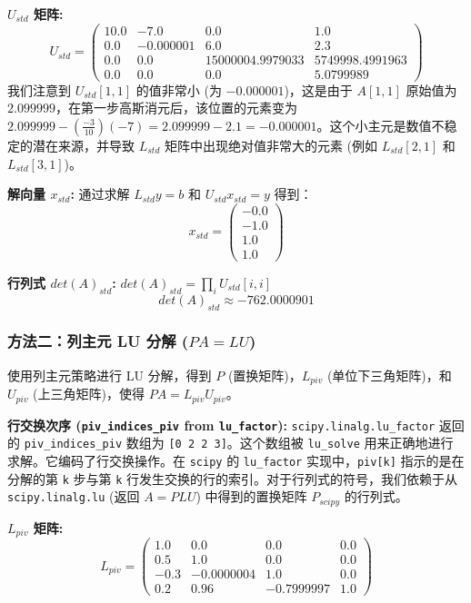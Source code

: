 \documentclass[11pt]{article}
\begin{document}
\textbf{\(U_{std}\) 矩阵:} \[ U_{std} = \begin{pmatrix}
10.0 & -7.0 & 0.0 & 1.0 \\
0.0 & -0.000001 & 6.0 & 2.3 \\
0.0 & 0.0 & 15000004.9979033 & 5749998.4991963 \\
0.0 & 0.0 & 0.0 & 5.0799989
\end{pmatrix} \] 我们注意到 \(U_{std}[1,1]\) 的值非常小 (为
\(-0.000001\))，这是由于 \(A[1,1]\) 原始值为
\(2.099999\)，在第一步高斯消元后，该位置的元素变为
\(2.099999 - (\frac{-3}{10})(-7) = 2.099999 - 2.1 = -0.000001\)。这个小主元是数值不稳定的潜在来源，并导致
\(L_{std}\) 矩阵中出现绝对值非常大的元素 (例如 \(L_{std}[2,1]\) 和
\(L_{std}[3,1]\))。

\textbf{解向量 \(x_{std}\):} 通过求解 \(L_{std}y = b\) 和
\(U_{std}x_{std} = y\) 得到：
\[ x_{std} = \begin{pmatrix} -0.0 \\ -1.0 \\ 1.0 \\ 1.0 \end{pmatrix} \]

\textbf{行列式 \(det(A)_{std}\):}
\(det(A)_{std} = \prod_{i} U_{std}[i,i]\)
\[ det(A)_{std} \approx -762.0000901 \]

\subsubsection{\texorpdfstring{方法二：列主元 LU 分解
(\(PA=LU\))}{方法二：列主元 LU 分解 (PA=LU)}}\label{ux65b9ux6cd5ux4e8cux5217ux4e3bux5143-lu-ux5206ux89e3-palu}

使用列主元策略进行 LU 分解，得到 \(P\) (置换矩阵)，\(L_{piv}\)
(单位下三角矩阵)，和 \(U_{piv}\) (上三角矩阵)，使得
\(PA = L_{piv}U_{piv}\)。

\textbf{行交换次序 (\texttt{piv\_indices\_piv} from
\texttt{lu\_factor}):} \texttt{scipy.linalg.lu\_factor} 返回的
\texttt{piv\_indices\_piv} 数组为 \texttt{{[}0\ 2\ 2\ 3{]}}。这个数组被
\texttt{lu\_solve} 用来正确地进行求解。它编码了行交换操作。在
\texttt{scipy} 的 \texttt{lu\_factor} 实现中，\texttt{piv{[}k{]}}
指示的是在分解的第 \texttt{k} 步与第 \texttt{k}
行发生交换的行的索引。对于行列式的符号，我们依赖于从
\texttt{scipy.linalg.lu} (返回 \(A=PLU\)) 中得到的置换矩阵 \(P_{scipy}\)
的行列式。

\textbf{\(L_{piv}\) 矩阵:} \[ L_{piv} = \begin{pmatrix}
1.0 & 0.0 & 0.0 & 0.0 \\
0.5 & 1.0 & 0.0 & 0.0 \\
-0.3 & -0.0000004 & 1.0 & 0.0 \\
0.2 & 0.96 & -0.7999997 & 1.0
\end{pmatrix} \]
\end{document}
